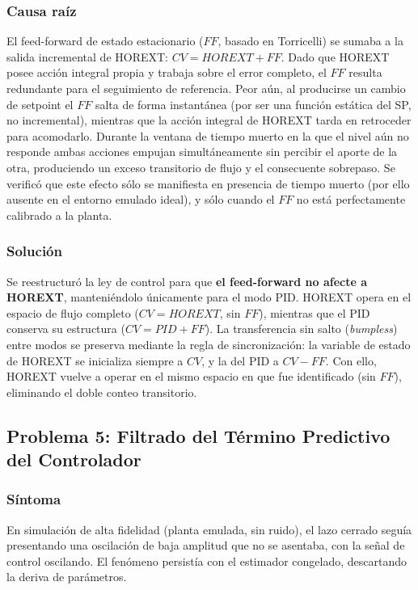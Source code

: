 \subsubsection{Causa raíz}
El feed-forward de estado estacionario ($FF$, basado en Torricelli) se sumaba a la salida incremental de HOREXT: $CV = HOREXT + FF$. Dado que HOREXT posee acción integral propia y trabaja sobre el error completo, el $FF$ resulta redundante para el seguimiento de referencia. Peor aún, al producirse un cambio de setpoint el $FF$ salta de forma instantánea (por ser una función estática del SP, no incremental), mientras que la acción integral de HOREXT tarda en retroceder para acomodarlo. Durante la ventana de tiempo muerto en la que el nivel aún no responde ambas acciones empujan simultáneamente sin percibir el aporte de la otra, produciendo un exceso transitorio de flujo y el consecuente sobrepaso. Se verificó que este efecto sólo se manifiesta en presencia de tiempo muerto (por ello ausente en el entorno emulado ideal), y sólo cuando el $FF$ no está perfectamente calibrado a la planta.

\subsubsection{Solución}
Se reestructuró la ley de control para que \textbf{el feed-forward no afecte a HOREXT}, manteniéndolo únicamente para el modo PID. HOREXT opera en el espacio de flujo completo ($CV = HOREXT$, sin $FF$), mientras que el PID conserva su estructura ($CV = PID + FF$). La transferencia sin salto (\textit{bumpless}) entre modos se preserva mediante la regla de sincronización: la variable de estado de HOREXT se inicializa siempre a $CV$, y la del PID a $CV - FF$. Con ello, HOREXT vuelve a operar en el mismo espacio en que fue identificado (sin $FF$), eliminando el doble conteo transitorio.

\subsection{Problema 5: Filtrado del Término Predictivo del Controlador}

\subsubsection{Síntoma}
En simulación de alta fidelidad (planta emulada, sin ruido), el lazo cerrado seguía presentando una oscilación de baja amplitud que no se asentaba, con la señal de control oscilando. El fenómeno persistía con el estimador congelado, descartando la deriva de parámetros.

